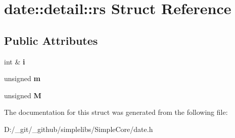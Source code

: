 \hypertarget{structdate_1_1detail_1_1rs}{}\section{date\+::detail\+::rs Struct Reference}
\label{structdate_1_1detail_1_1rs}
\subsection*{Public Attributes}
\begin{DoxyCompactItemize}
\item 
\mbox{\label{structdate_1_1detail_1_1rs_ac16dc3c2005fe988bf855867085abcad}} 
int \& {\bfseries i}
\item 
\mbox{\label{structdate_1_1detail_1_1rs_aaf84430508cc4e0051fae508cdc65d79}} 
unsigned {\bfseries m}
\item 
\mbox{\label{structdate_1_1detail_1_1rs_a5d0a7c17a3531864c5c2e2ed34079b7c}} 
unsigned {\bfseries M}
\end{DoxyCompactItemize}


The documentation for this struct was generated from the following file\+:\begin{DoxyCompactItemize}
\item 
D\+:/\+\_\+git/\+\_\+github/simplelibs/\+Simple\+Core/date.\+h\end{DoxyCompactItemize}
